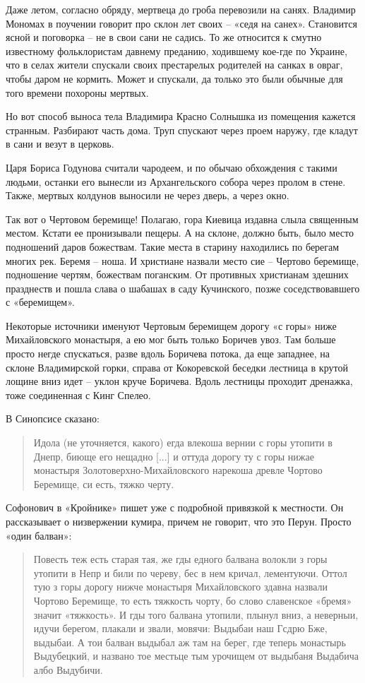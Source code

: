Даже летом, согласно обряду, мертвеца до гроба перевозили на санях. Владимир Мономах в поучении говорит про склон лет своих – «седя на санех». Становится ясной и поговорка – не в свои сани не садись. То же относится к смутно известному фольклористам давнему преданию, ходившему кое-где по Украине, что в селах жители спускали своих престарелых родителей на санках в овраг, чтобы даром не кормить. Может и спускали, да только это были обычные для того времени похороны мертвых.

Но вот способ выноса тела Владимира Красно Солнышка из помещения кажется странным. Разбирают часть дома. Труп спускают через проем наружу, где кладут в сани и везут в церковь.

Царя Бориса Годунова считали чародеем, и по обычаю обхождения с такими людьми, останки его вынесли из Архангельского собора через пролом в стене. Также, мертвых колдунов выносили не через дверь, а через окно.

Так вот о Чертовом беремище! Полагаю, гора Киевица издавна слыла священным местом. Кстати ее пронизывали пещеры. А на склоне, должно быть, было место подношений даров божествам. Такие места в старину находились по берегам многих рек. Беремя – ноша. И христиане назвали место сие – Чертово беремище, подношение чертям, божествам поганским. От противных христианам здешних празднеств и пошла слава о шабашах в саду Кучинского, позже соседствовавшего с «беремищем».

Некоторые источники именуют Чертовым беремищем дорогу «с горы» ниже Михайловского монастыря, а ею мог быть только Боричев увоз. Там больше просто негде спускаться, разве вдоль Боричева потока, да еще западнее, на склоне Владимирской горки, справа от Кокоревской беседки лестница в крутой лощине вниз идет – уклон круче Боричева. Вдоль лестницы проходит дренажка, тоже соединенная с Кинг Спелео.

В Синопсисе\cite{sinopsis} сказано:

\begin{quotation}
Идола (не уточняется, какого) егда влекоша вернии с горы утопити в Днепр, биюще его нещадно [...] и оттуда дорогу ту с горы нижае монастыря Золотоверхно-Михайловского нарекоша древле Чортово Беремище, си есть, тяжко черту.
\end{quotation}

Софонович в «Кройнике» пишет уже с подробной привязкой к местности. Он рассказывает о низвержении кумира, причем не говорит, что это Перун. Просто «один балван»:

\begin{quotation}
Повесть теж есть старая тая, же гды едного балвана волокли з горы утопити в Непр и били по череву, бес в нем кричал, лементуючи. Оттол тую з горы дорогу нижче монастыря Михайловского здавна назвали Чортово Беремище, то есть тяжкость чорту, бо слово славенское «бремя» значит «тяжкость». И гды того балвана утопили, плынул вниз, а неверныи, идучи берегом, плакали и звали, мовячи: Выдыбаи наш Гсдрю Бже, выдыбаи. А тои балван выдыбал аж там на берег, где теперь монастырь Выдубецкий, и названо тое местьце тым урочищем от выдыбаня Выдабича албо Выдубичи.
\end{quotation}

